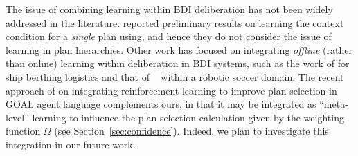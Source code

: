 The issue of combining learning within BDI deliberation has not been widely addressed in the literature.
\citet{hernandez04:learning} reported preliminary results on learning the context condition for a \emph{single} plan using, and hence they do not consider the issue of learning in plan hierarchies.
Other work has focused on integrating \emph{offline} (rather than online) learning within deliberation in BDI systems, such as the work of \citet{lokuge07:improving} for ship berthing logistics and that of ~\citet{riedmiller01:karlsruhe} within a robotic soccer domain.
The recent approach of \citet{broekens10:reinforcement} on integrating reinforcement learning to improve plan selection in GOAL agent language complements ours, in that it may be integrated as ``meta-level'' learning to influence the plan selection calculation given by the weighting function $\Omega$ (see Section~\ref{sec:confidence}). Indeed, we plan to investigate this integration in our future work.







